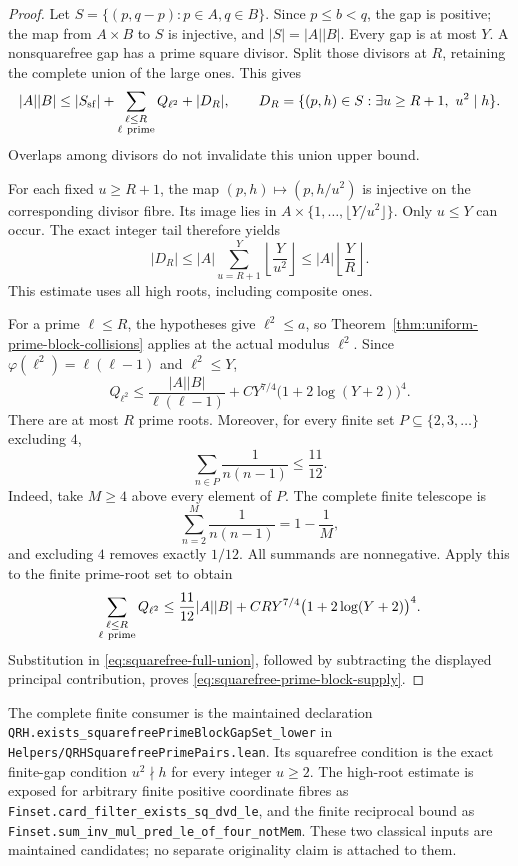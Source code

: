 \documentclass[11pt]{article}
\begin{document}
\begin{proof}
Let \(S=\{(p,q-p):p\in A,q\in B\}\). Since \(p\le b<q\),
the gap is positive; the map from \(A\times B\) to \(S\) is injective,
and \(|S|=|A||B|\). Every gap is at most \(Y\).
A nonsquarefree gap has a prime square divisor. Split those divisors
at \(R\), retaining the complete union of the large ones. This gives
\begin{equation}
 |A||B|
 \le |S_{\rm sf}|+
       \sum_{\substack{\ell\le R\\\ell\ {\rm prime}}}Q_{\ell^2}
       +|D_R|,\qquad
 D_R=\{(p,h)\in S:\exists u\ge R+1,\ u^2\mid h\}.
 \label{eq:squarefree-full-union}
\end{equation}
Overlaps among divisors do not invalidate this union upper bound.

For each fixed \(u\ge R+1\), the map
\((p,h)\mapsto(p,h/u^2)\) is injective on the corresponding
divisor fibre. Its image lies in
\(A\times\{1,\ldots,\lfloor Y/u^2\rfloor\}\).
Only \(u\le Y\) can occur. The exact integer tail therefore yields
\[
 |D_R|
 \le |A|\sum_{u=R+1}^{Y}\left\lfloor\frac{Y}{u^2}\right\rfloor
 \le |A|\left\lfloor\frac YR\right\rfloor .
\]
This estimate uses all high roots, including composite ones.

For a prime \(\ell\le R\), the hypotheses give
\(\ell^2\le a\), so Theorem~\ref{thm:uniform-prime-block-collisions}
applies at the actual modulus \(\ell^2\). Since
\(\varphi(\ell^2)=\ell(\ell-1)\) and \(\ell^2\le Y\),
\[
 Q_{\ell^2}
 \le \frac{|A||B|}{\ell(\ell-1)}
       +CY^{7/4}\bigl(1+2\log(Y+2)\bigr)^4.
\]
There are at most \(R\) prime roots. Moreover, for every finite
set \(P\subseteq\{2,3,\ldots\}\) excluding \(4\),
\[
 \sum_{n\in P}\frac{1}{n(n-1)}\le\frac{11}{12}.
\]
Indeed, take \(M\ge4\) above every element of \(P\). The complete
finite telescope is
\[
 \sum_{n=2}^{M}\frac{1}{n(n-1)}=1-\frac1M,
\]
and excluding \(4\) removes exactly \(1/12\). All summands are
nonnegative. Apply this to the finite prime-root set to obtain
\[
 \sum_{\substack{\ell\le R\\\ell\ {\rm prime}}}Q_{\ell^2}
 \le \frac{11}{12}|A||B|
       +CRY^{7/4}\bigl(1+2\log(Y+2)\bigr)^4.
\]
Substitution in \eqref{eq:squarefree-full-union}, followed by
subtracting the displayed principal contribution, proves
\eqref{eq:squarefree-prime-block-supply}.
\end{proof}

The complete finite consumer is the maintained declaration
\texttt{QRH.exists\_squarefreePrimeBlockGapSet\_lower} in
\texttt{Helpers/QRHSquarefreePrimePairs.\allowbreak lean}.
Its squarefree condition is the exact finite-gap condition
\(u^2\nmid h\) for every integer \(u\ge2\).
The high-root estimate is exposed for arbitrary finite positive
coordinate fibres as
\texttt{Finset.card\_filter\_exists\_sq\_dvd\_le}, and the finite
reciprocal bound as
\texttt{Finset.sum\_inv\_mul\_pred\_le\_of\_four\_notMem}.
These two classical inputs are maintained candidates; no separate
originality claim is attached to them.
\end{document}
